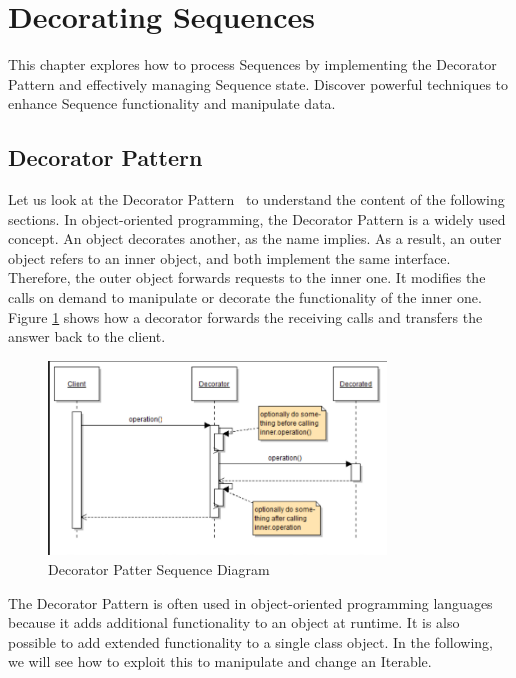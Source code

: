 \section{Decorating Sequences}
\label{sec:Decorating Sequences}
This chapter explores how to process Sequences by implementing the Decorator 
Pattern and effectively managing Sequence state. Discover powerful techniques 
to enhance Sequence functionality and manipulate data.

\subsection{Decorator Pattern}
\label{sub:Decorator Pattern}
Let us look at the Decorator Pattern~\cite[p.~226]{gang_of_four_depa} to understand the content of the 
following sections. In object-oriented programming, the Decorator Pattern is a 
widely used concept. An object decorates another, as the name implies. As a 
result, an outer object refers to an inner object, and both implement the same 
interface. Therefore, the outer object forwards requests to the inner one. It 
modifies the calls on demand to manipulate or decorate the functionality of the 
inner one. Figure \ref{fig:seq_diagramm} shows how a decorator forwards the receiving calls and 
transfers the answer back to the client.

\begin{figure}[H]
    \centering
    \includegraphics[width=0.8\textwidth]{./mainmatter/pictures/decorator_sequence_diagramm.png}
    \caption{Decorator Patter Sequence Diagram}
    \label{fig:seq_diagramm}
\end{figure}

The Decorator Pattern is often used in object-oriented programming languages 
because it adds additional functionality to an object at runtime. It is also 
possible to add extended functionality to a single class object. In the 
following, we will see how to exploit this to manipulate and change an Iterable.

